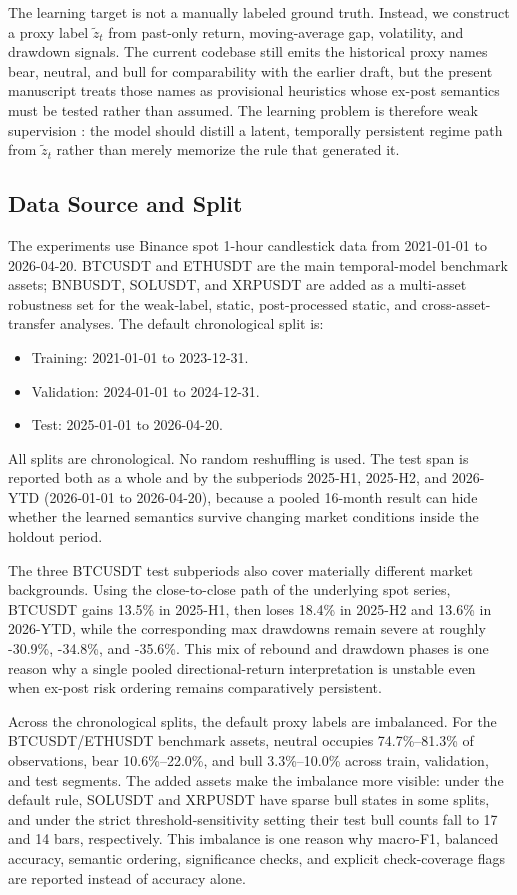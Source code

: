 \documentclass[a4paper,fleqn]{cas-dc}
\begin{document}
The learning target is not a manually labeled ground truth. Instead, we construct a proxy label $\tilde{z}_t$ from past-only return, moving-average gap, volatility, and drawdown signals. The current codebase still emits the historical proxy names bear, neutral, and bull for comparability with the earlier draft, but the present manuscript treats those names as provisional heuristics whose ex-post semantics must be tested rather than assumed. The learning problem is therefore weak supervision \cite{zhou2018weakly,ratner2020snorkel,zhang2022programmatic}: the model should distill a latent, temporally persistent regime path from $\tilde{z}_t$ rather than merely memorize the rule that generated it.

\subsection{Data Source and Split}
The experiments use Binance spot 1-hour candlestick data from 2021-01-01 to 2026-04-20. BTCUSDT and ETHUSDT are the main temporal-model benchmark assets; BNBUSDT, SOLUSDT, and XRPUSDT are added as a multi-asset robustness set for the weak-label, static, post-processed static, and cross-asset-transfer analyses. The default chronological split is:
\begin{itemize}
\item Training: 2021-01-01 to 2023-12-31.
\item Validation: 2024-01-01 to 2024-12-31.
\item Test: 2025-01-01 to 2026-04-20.
\end{itemize}

All splits are chronological. No random reshuffling is used. The test span is reported both as a whole and by the subperiods 2025-H1, 2025-H2, and 2026-YTD (2026-01-01 to 2026-04-20), because a pooled 16-month result can hide whether the learned semantics survive changing market conditions inside the holdout period.

The three BTCUSDT test subperiods also cover materially different market backgrounds. Using the close-to-close path of the underlying spot series, BTCUSDT gains 13.5\% in 2025-H1, then loses 18.4\% in 2025-H2 and 13.6\% in 2026-YTD, while the corresponding max drawdowns remain severe at roughly -30.9\%, -34.8\%, and -35.6\%. This mix of rebound and drawdown phases is one reason why a single pooled directional-return interpretation is unstable even when ex-post risk ordering remains comparatively persistent.

Across the chronological splits, the default proxy labels are imbalanced. For the BTCUSDT/ETHUSDT benchmark assets, neutral occupies 74.7\%--81.3\% of observations, bear 10.6\%--22.0\%, and bull 3.3\%--10.0\% across train, validation, and test segments. The added assets make the imbalance more visible: under the default rule, SOLUSDT and XRPUSDT have sparse bull states in some splits, and under the strict threshold-sensitivity setting their test bull counts fall to 17 and 14 bars, respectively. This imbalance is one reason why macro-F1, balanced accuracy, semantic ordering, significance checks, and explicit check-coverage flags are reported instead of accuracy alone.
\end{document}
